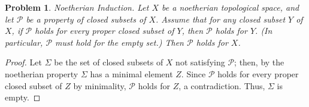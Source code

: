 \documentclass[12pt,letterpaper]{article}
\newtheorem{problem}{Problem}[section]
\theoremstyle{definition}
\theoremstyle{remark}
\numberwithin{equation}{section}
\numberwithin{figure}{problem}
\begin{document}
\begin{problem}
  \emph{Noetherian Induction}. Let $X$ be a noetherian topological space, and let $\mathscr{P}$ be a property of closed subsets of $X$. Assume that for any closed subset $Y$ of $X$, if $\mathscr{P}$ holds for every proper closed subset of $Y$, then $\mathscr{P}$ holds for $Y$. (In particular, $\mathscr{P}$ must hold for the empty set.) Then $\mathscr{P}$ holds for $X$.
\end{problem}
\begin{proof}
  Let $\Sigma$ be the set of closed subsets of $X$ not satisfying $\mathscr{P}$; then, by the noetherian property $\Sigma$ has a minimal element $Z$. Since $\mathscr{P}$ holds for every proper closed subset of $Z$ by minimality, $\mathscr{P}$ holds for $Z$, a contradiction. Thus, $\Sigma$ is empty.
\end{proof}
\end{document}
